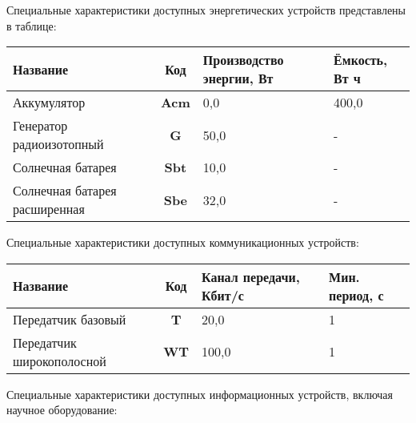 \documentclass[12pt,a4paper]{article}
\begin{document}
Специальные характеристики доступных энергетических устройств представлены в таблице:

\begin{center}
\begin{tabular}{ |p{7cm}|c|p{3cm}|p{3cm}| }
  \hline
  \textbf{Название} & \textbf{Код} &
  \textbf{Производство энергии, Вт} &
  \textbf{Ёмкость, Вт ч} \\
  \hline
Аккумулятор & \textbf{Acm} & 0,0 & 400,0 \\
\hline
Генератор радиоизотопный & \textbf{G} & 50,0 & - \\
\hline
Солнечная батарея & \textbf{Sbt} & 10,0 & - \\
\hline
Солнечная батарея расширенная & \textbf{Sbe} & 32,0 & - \\
\hline
\end{tabular}
\end{center}

Специальные характеристики доступных коммуникационных устройств:

\begin{center}
\begin{tabular}{ |p{7cm}|c|p{3cm}|p{3cm}| }
  \hline
  \textbf{Название} & \textbf{Код} &
  \textbf{Канал передачи, Кбит/с} &
  \textbf{Мин. период, с} \\
  \hline
Передатчик базовый & \textbf{T} & 20,0 & 1 \\
\hline
Передатчик широкополосной & \textbf{WT} & 100,0 & 1 \\
\hline
\end{tabular}
\end{center}

Специальные характеристики доступных информационных устройств, включая научное
оборудование:
\end{document}

